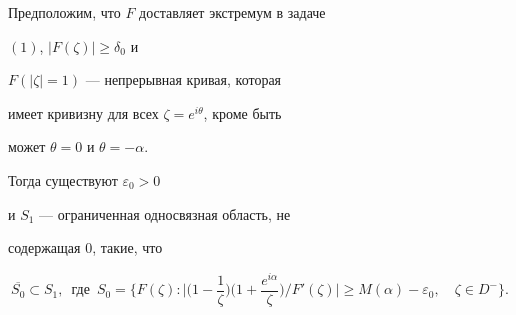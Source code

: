 \begin{lem} Предположим, что $F$ доставляет экстремум в задаче


$(1)$, $|F(\zeta)| \ge \delta_0$ и


$F(|\zeta|=1)$ --- непрерывная кривая, которая


имеет кривизну для всех $\zeta=e^{i\theta}$, кроме быть


может $\theta = 0$ и $\theta = -\alpha$.





Тогда существуют $\varepsilon_0 >0$


и $S_1$ --- ограниченная односвязная область, не


содержащая $0$, такие, что


\begin{equation}


\overline{S_0} \subset S_1,\; \ \text{где} \; \


S_0 = \bigg\{ F(\zeta):


\bigg|\bigg(1-\frac{1}{\zeta}\bigg)\bigg(1+\frac{e^{i\alpha}}{\zeta}\bigg)/


F'(\zeta)\bigg| \ge M(\alpha)-\varepsilon_0, \quad \zeta \in D^-


\bigg\}.


\end{equation}


\end{lem}





